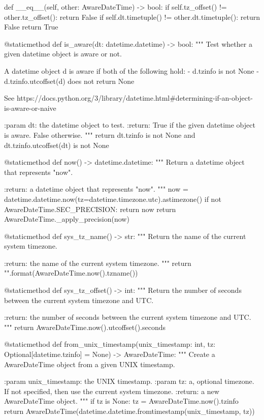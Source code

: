 \documentclass{article}
\begin{document}
\begin{python}
    def __eq__(self, other: AwareDateTime) -> bool:
        if self.tz_offset() != other.tz_offset():
            return False
        if self.dt.timetuple() != other.dt.timetuple():
            return False
        return True

    @staticmethod
    def is_aware(dt: datetime.datetime) -> bool:
        """
        Test whether a given datetime object is aware or not.

        A datetime object d is aware if both of the following hold:
          -  d.tzinfo is not None
          -  d.tzinfo.utcoffset(d) does not return None

        See https://docs.python.org/3/library/datetime.html#determining-if-an-object-is-aware-or-naive

        :param dt: the datetime object to test.
        :return: True if the given datetime object is aware. False otherwise.
        """
        return dt.tzinfo is not None and dt.tzinfo.utcoffset(dt) is not None

    @staticmethod
    def now() -> datetime.datetime:
        """
        Return a datetime object that represents "now".

        :return: a datetime object that represents "now".
        """
        now = datetime.datetime.now(tz=datetime.timezone.utc).astimezone()
        if not AwareDateTime.SEC_PRECISION:
            return now
        return AwareDateTime._apply_precision(now)

    @staticmethod
    def sys_tz_name() -> str:
        """
        Return the name of the current system timezone.

        :return: the name of the current system timezone.
        """
        return "{}".format(AwareDateTime.now().tzname())

    @staticmethod
    def sys_tz_offset() -> int:
        """
        Return the number of seconds between the current system timezone and UTC.

        :return: the number of seconds between the current system timezone and UTC.
        """
        return AwareDateTime.now().utcoffset().seconds

    @staticmethod
    def from_unix_timestamp(unix_timestamp: int, tz: Optional[datetime.tzinfo] = None) -> AwareDateTime:
        """
        Create a AwareDateTime object from a given UNIX timestamp.

        :param unix_timestamp: the UNIX timestamp.
        :param tz: a, optional timezone. If not specified, then use the current system timezone.
        :return: a new AwareDateTime object.
        """
        if tz is None:
            tz = AwareDateTime.now().tzinfo
        return AwareDateTime(datetime.datetime.fromtimestamp(unix_timestamp, tz))


\end{python}
\end{document}
